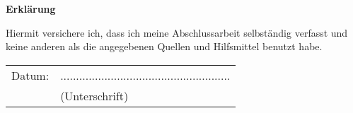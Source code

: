\thispagestyle{empty}
\begin{center}
	\vspace*{10em}
	\huge\textbf{Erklärung}
\end{center}
\vspace{2em}
Hiermit versichere ich, dass ich meine Abschlussarbeit selbständig verfasst und
keine anderen als die angegebenen Quellen und Hilfsmittel benutzt habe.

\vspace{4em}
\begin{tabular}{p{15em}p{15em}}
	Datum: &  ......................................................\\
	& \centering (Unterschrift)
\end{tabular}
\vfill
